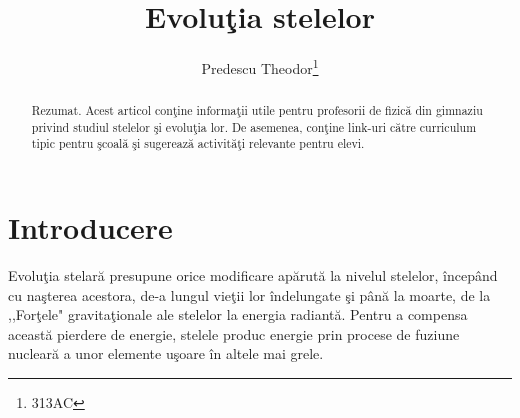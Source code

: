 \documentclass{article}
\title{Evoluţia stelelor}
\author{Predescu Theodor\footnote{313AC}}
\date{}
\begin{document}
\maketitle
\begin{abstract}
Rezumat. Acest articol conţine informaţii utile pentru profesorii de fizică din gimnaziu privind studiul stelelor şi evoluţia lor. De asemenea, conţine link-uri către curriculum tipic pentru şcoală şi sugerează activităţi relevante pentru elevi.
\end{abstract}
%
\section{Introducere}\label{intro}
	Evoluţia stelară presupune orice modificare apărută la nivelul stelelor, începând cu naşterea acestora, de-a lungul vieţii lor îndelungate şi până la moarte, de la ,,Forţele" gravitaţionale ale stelelor la energia radiantă. Pentru a compensa această pierdere de energie, stelele produc energie prin procese de fuziune nucleară a unor elemente uşoare în altele mai grele. 
\end{document}
